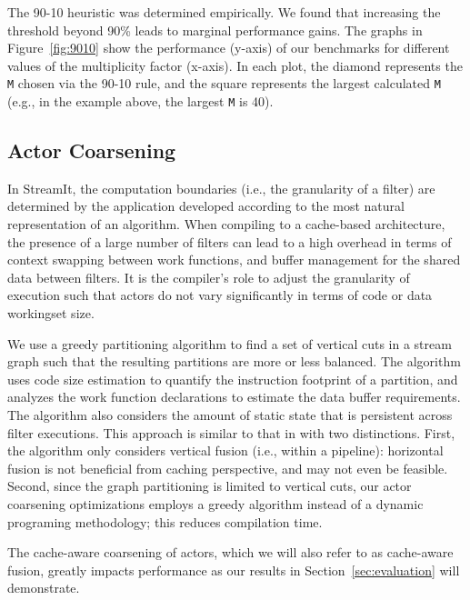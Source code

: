 The 90-10 heuristic was determined empirically. We found that
increasing the threshold beyond 90\% leads to marginal
performance gains. The graphs in Figure~\ref{fig:9010} show the
performance (y-axis) of our benchmarks for different values of the multiplicity
factor (x-axis). In each plot, the diamond represents the \texttt{M} chosen via
the 90-10 rule, and the square represents the largest calculated
\texttt{M} (e.g., in the example above, the largest \texttt{M} is 40).

\subsection{Actor Coarsening}

In StreamIt, the computation boundaries (i.e., the granularity of a
filter) are determined by the application developed according to the
most natural representation of an algorithm. When compiling to a
cache-based architecture, the presence of a  large number of filters
can lead to a high overhead in terms of context swapping between work
functions, and buffer management for the shared data between filters.
It is the compiler's role to adjust the granularity of execution such
that actors do not vary significantly in terms of code  or data
workingset size.

We use a greedy partitioning algorithm to find a set of vertical cuts
in a stream graph such that the resulting partitions are more or less
balanced. The algorithm uses code size estimation to quantify the
instruction footprint of a partition, and analyzes the work function
declarations to estimate the data buffer requirements. The algorithm
also considers the amount of static state that is persistent across
filter executions. This approach is similar to that in
\cite{streamit-asplos} with two distinctions. First, the algorithm
only considers vertical fusion (i.e., within a pipeline): horizontal
fusion is not beneficial from  caching perspective, and may not even
be feasible. Second, since the graph partitioning is limited to
vertical cuts, our actor coarsening optimizations employs a greedy
algorithm instead of a dynamic programing methodology; this reduces
compilation time. 

The cache-aware coarsening of actors, which we will also refer to as
cache-aware fusion, greatly impacts performance as
our results in Section~\ref{sec:evaluation} will demonstrate.